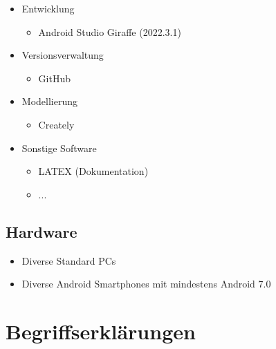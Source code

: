 \documentclass[oneside, ngerman]{sdqtechreport}
\begin{document}
\begin{itemize}
    \item Entwicklung
    \begin{itemize}
        \item Android Studio Giraffe (2022.3.1)
    \end{itemize}
    
    \item Versionsverwaltung
    \begin{itemize}
        \item GitHub
    \end{itemize}

    \item Modellierung
    \begin{itemize}
        \item Creately
    \end{itemize}

    \item Sonstige Software
    \begin{itemize}
        \item LATEX (Dokumentation)
        \item ...
    \end{itemize}
    
\end{itemize}

\section{Hardware}
\label{sec:Entwicklungsumgebung:Hardware}

\begin{itemize}
    \item Diverse Standard PCs
    \item Diverse Android Smartphones mit mindestens Android 7.0
\end{itemize}


\chapter{Begriffserklärungen}
\label{chap:Begriffserklärungen}


\section{}
\end{document}
